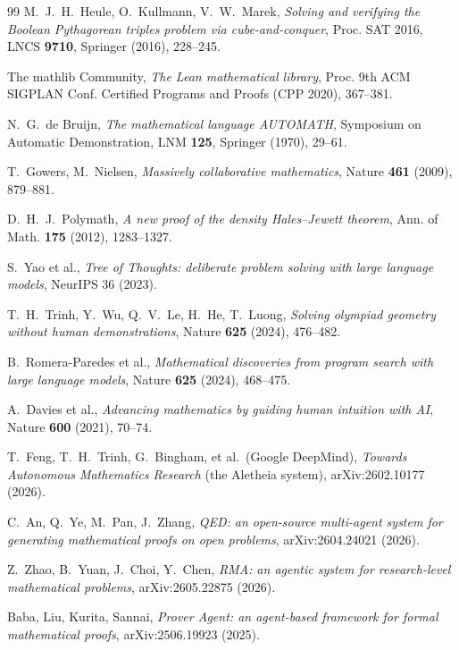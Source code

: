 \documentclass[11pt]{amsart}
\theoremstyle{definition}
\theoremstyle{remark}
\begin{document}
\begin{thebibliography}{99}
 M.~J.~H.~Heule, O.~Kullmann, V.~W.~Marek, \emph{Solving and
verifying the Boolean Pythagorean triples problem via cube-and-conquer}, Proc.
SAT 2016, LNCS \textbf{9710}, Springer (2016), 228--245.

 The mathlib Community, \emph{The Lean mathematical library},
Proc. 9th ACM SIGPLAN Conf. Certified Programs and Proofs (CPP 2020), 367--381.

 N.~G.~de Bruijn, \emph{The mathematical language AUTOMATH},
Symposium on Automatic Demonstration, LNM \textbf{125}, Springer (1970), 29--61.

 T.~Gowers, M.~Nielsen, \emph{Massively collaborative
mathematics}, Nature \textbf{461} (2009), 879--881.

 D.~H.~J.~Polymath, \emph{A new proof of the density
Hales--Jewett theorem}, Ann. of Math. \textbf{175} (2012), 1283--1327.

 S.~Yao et al., \emph{Tree of Thoughts: deliberate problem
solving with large language models}, NeurIPS 36 (2023).

 T.~H.~Trinh, Y.~Wu, Q.~V.~Le, H.~He, T.~Luong, \emph{Solving
olympiad geometry without human demonstrations}, Nature \textbf{625} (2024),
476--482.

 B.~Romera-Paredes et al., \emph{Mathematical
discoveries from program search with large language models}, Nature \textbf{625}
(2024), 468--475.

 A.~Davies et al., \emph{Advancing mathematics by guiding
human intuition with AI}, Nature \textbf{600} (2021), 70--74.

 T.~Feng, T.~H.~Trinh, G.~Bingham, et al.\ (Google
DeepMind), \emph{Towards Autonomous Mathematics Research} (the Aletheia
system), arXiv:2602.10177 (2026).

 C.~An, Q.~Ye, M.~Pan, J.~Zhang, \emph{QED: an open-source
multi-agent system for generating mathematical proofs on open problems},
arXiv:2604.24021 (2026).

 Z.~Zhao, B.~Yuan, J.~Choi, Y.~Chen, \emph{RMA: an agentic system
for research-level mathematical problems}, arXiv:2605.22875 (2026).

 Baba, Liu, Kurita, Sannai, \emph{Prover Agent: an
agent-based framework for formal mathematical proofs}, arXiv:2506.19923 (2025).


\end{thebibliography}
\end{document}
